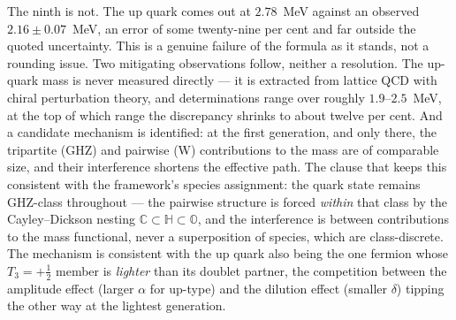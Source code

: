 The ninth is not. The up quark comes out at $2.78$~MeV against an observed $2.16 \pm 0.07$~MeV, an
error of some twenty-nine per cent and far outside the quoted uncertainty. This is a genuine failure
of the formula as it stands, not a rounding issue. Two mitigating
observations follow, neither a resolution. The up-quark mass is never measured directly --- it is
extracted from lattice QCD with chiral perturbation theory, and determinations range over roughly
$1.9$--$2.5$~MeV, at the top of which range the discrepancy shrinks to about twelve per cent. And a
candidate mechanism is identified: at the first generation, and only there, the tripartite (GHZ) and
pairwise (W) contributions to the mass are of comparable size, and their interference shortens the
effective path. The clause that keeps this consistent with the framework's species assignment: the
quark state remains GHZ-class throughout --- the pairwise structure is forced \emph{within} that
class by the Cayley--Dickson nesting $\mathbb{C} \subset \mathbb{H} \subset \mathbb{O}$, and
the interference is between contributions to the mass functional, never a superposition of
species, which are class-discrete. The mechanism is consistent with the up quark also being the
one fermion whose $T_3 = +\tfrac12$ member is \emph{lighter} than its doublet partner, the
competition between the amplitude effect (larger $\alpha$ for up-type) and the dilution effect
(smaller $\delta$) tipping the other way at the lightest generation.

